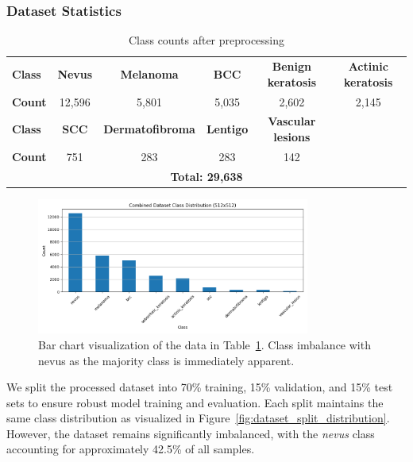 \documentclass{article} %
\begin{document}
\subsubsection{Dataset Statistics}

\begin{table}[H]
\caption{Class counts after preprocessing}
\label{class-counts}
\begin{center}
\footnotesize
\begin{tabular}{lccccc}
\toprule
\textbf{Class} & \textbf{Nevus} & \textbf{Melanoma} & \textbf{BCC} & \textbf{Benign keratosis} & \textbf{Actinic keratosis} \\
\textbf{Count} & 12,596 & 5,801 & 5,035 & 2,602 & 2,145 \\
\midrule
\textbf{Class} & \textbf{SCC} & \textbf{Dermatofibroma} & \textbf{Lentigo} & \textbf{Vascular lesions} & \\
\textbf{Count} & 751 & 283 & 283 & 142 & \\
\midrule
\multicolumn{6}{c}{\textbf{Total: 29,638}} \\
\bottomrule
\end{tabular}
\end{center}
\end{table}


\begin{figure}[H]
\begin{center}
\includegraphics[width=0.8\textwidth]{Figs/class_distribution.png}
\end{center}
\caption{Bar chart visualization of the data in Table~\ref{class-counts}. Class imbalance with nevus as the majority class is immediately apparent.}
\end{figure}


We split the processed dataset into 70\% training, 15\% validation, and 15\% test sets to ensure robust model training and evaluation. Each split maintains the same class distribution as visualized in Figure~\ref{fig:dataset_split_distribution}. However, the dataset remains significantly imbalanced, with the \textit{nevus} class accounting for approximately 42.5\% of all samples.
\end{document}
